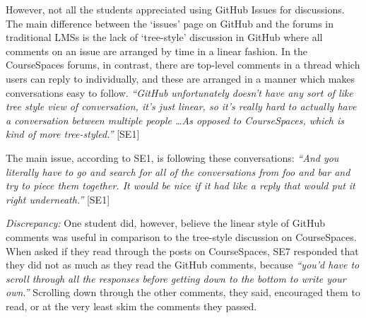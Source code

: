 However, not all the students appreciated using GitHub Issues for discussions. The main difference between the `issues' page on GitHub and the forums in traditional LMSs is the lack of `tree-style' discussion in GitHub where all comments on an issue are arranged by time in a linear fashion. In the CourseSpaces forums, in contrast, there are top-level comments in a thread which users can reply to individually, and these are arranged in a manner which makes conversations easy to follow. \textit{``GitHub unfortunately doesn't have any sort of like tree style view of conversation, it's just linear, so it's really hard to actually have a conversation between multiple people \ldots As opposed to CourseSpaces, which is kind of more tree-styled.''} [SE1]

The main issue, according to SE1, is following these conversations: \textit{``And you literally have to go and search for all of the conversations from foo and bar and try to piece them together. It would be nice if it had like a reply that would put it right underneath.''} [SE1]


\emph{Discrepancy:} One student did, however, believe the linear style of GitHub comments was useful in comparison to the tree-style discussion on CourseSpaces. When asked if they read through the posts on CourseSpaces, SE7 responded that they did not as much as they read the GitHub comments, because \textit{``you'd have to scroll through all the responses before getting down to the bottom to write your own.''} Scrolling down through the other comments, they said, encouraged them to read, or at the very least skim the comments they passed. %


